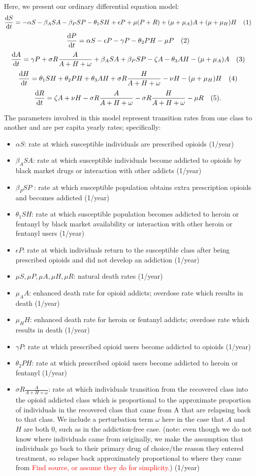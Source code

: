 \documentclass[12pt]{article}
\begin{document}
 
Here, we present our ordinary differential equation model: %
\[\dv{S}{t} = -\alpha S - \beta_{A} SA  -\beta_{P} SP- \theta_{1} SH +\epsilon P +\mu (P+R) + (\mu+\mu_{A})A + (\mu+\mu_{H}) H \quad (1)\] 
\[\dv{P}{t} = \alpha S - \epsilon P  - \gamma P - \theta_{2}PH- \mu P    \quad(2)\]
\[\dv{A}{t} = \gamma P + \sigma R \frac{A}{A+H+\omega} +\beta_{A} SA  +\beta_{P} SP -\zeta A - \theta_{3}AH-(\mu + \mu_{A})A   \quad (3)\]
\[\dv{H}{t} = \theta_{1}SH+\theta_{2}PH+\theta_{3}AH + \sigma R \frac{H}{A+H+\omega}-\nu H-(\mu+\mu_{H})H  \quad (4)\]
\[\dv{R}{t} = \zeta A +\nu H -\sigma R \frac{A}{A+H+\omega}-\sigma R \frac{H}{A+H+\omega} -\mu R\quad(5).\]


The parameters involved in this model represent transition rates from one class to another and are per capita yearly rates; specifically: 
\begin{itemize}
\item $\alpha S$: rate at which susceptible individuals are prescribed opioids (1/year)
\item $\beta_{A} SA$: rate at which susceptible individuals become addicted to opioids by black market drugs or interaction with other addicts (1/year)
\item $\beta_{P} SP$ : rate at which susceptible population obtains extra prescription opioids and becomes addicted  (1/year)
\item $\theta_1 SH$: rate at which susceptible population becomes addicted to heroin or fentanyl by black market availability or interaction with other heroin or fentanyl users  (1/year)
\item $\epsilon P$: rate at which individuals return to the susceptible class after being prescribed opioids and did not develop an addiction (1/year) 
\item $\mu S, \mu P, \mu A, \mu H, \mu R$: natural death rates (1/year)
\item $\mu_A A$: enhanced death rate for opioid addicts; overdose rate which results in death (1/year)
\item $\mu_H H$: enhanced death rate for heroin or fentanyl addicts; overdose rate which results in death (1/year)
\item $\gamma P$: rate at which prescribed opioid users become addicted to opioids (1/year)
\item $\theta_2 PH$: rate at which prescribed opioid users become addicted to heroin or fentanyl (1/year)
\item $\sigma R \frac{A}{A+H+\omega}$: rate at which individuals transition from the recovered class into the opioid addicted class which is proportional to the approximate proportion of individuals in the recovered class that came from A that are relapsing back to that class. We include a perturbation term $\omega$ here in the case that $A$ and $H$ are both 0, such as in the addiction-free case. (note: even though we do not know where individuals came from originally, we make the assumption that individuals go back to their primary drug of choice/the reason they entered treatment, so relapse back approximately proportional to where they came from \textcolor{red}{Find source, or assume they do for simplicity.}) (1/year)

\end{itemize}
\end{document}
